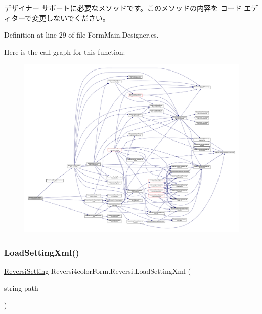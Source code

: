 デザイナー サポートに必要なメソッドです。このメソッドの内容を コード エディターで変更しないでください。 



Definition at line 29 of file Form\+Main.\+Designer.\+cs.

Here is the call graph for this function\+:\nopagebreak
\begin{figure}[H]
\begin{center}
\leavevmode
\includegraphics[width=350pt]{class_reversi4color_form_1_1_reversi_a9eb7787e255c6aab7c75d6f0730e579e_cgraph}
\end{center}
\end{figure}
\mbox{\label{class_reversi4color_form_1_1_reversi_a944e9618d0eac2a6928d8a8ec835d384}} 
\subsubsection{\texorpdfstring{Load\+Setting\+Xml()}{LoadSettingXml()}}
{\footnotesize\ttfamily \hyperlink{class_reversi4color_form_1_1_reversi_setting}{Reversi\+Setting} Reversi4color\+Form.\+Reversi.\+Load\+Setting\+Xml (\begin{DoxyParamCaption}\item[{string}]{path }\end{DoxyParamCaption})}



